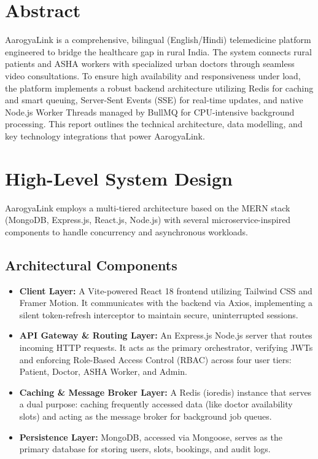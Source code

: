 \documentclass[12pt, a4paper]{article}
\begin{document}
\section{Abstract}
AarogyaLink is a comprehensive, bilingual (English/Hindi) telemedicine platform engineered to bridge the healthcare gap in rural India. The system connects rural patients and ASHA workers with specialized urban doctors through seamless video consultations. To ensure high availability and responsiveness under load, the platform implements a robust backend architecture utilizing Redis for caching and smart queuing, Server-Sent Events (SSE) for real-time updates, and native Node.js Worker Threads managed by BullMQ for CPU-intensive background processing. This report outlines the technical architecture, data modelling, and key technology integrations that power AarogyaLink.

\section{High-Level System Design}
AarogyaLink employs a multi-tiered architecture based on the MERN stack (MongoDB, Express.js, React.js, Node.js) with several microservice-inspired components to handle concurrency and asynchronous workloads.

\subsection{Architectural Components}
\begin{itemize}[label=\textbullet]
    \item \textbf{Client Layer:} A Vite-powered React 18 frontend utilizing Tailwind CSS and Framer Motion. It communicates with the backend via Axios, implementing a silent token-refresh interceptor to maintain secure, uninterrupted sessions.
    \item \textbf{API Gateway \& Routing Layer:} An Express.js Node.js server that routes incoming HTTP requests. It acts as the primary orchestrator, verifying JWTs and enforcing Role-Based Access Control (RBAC) across four user tiers: Patient, Doctor, ASHA Worker, and Admin.
    \item \textbf{Caching \& Message Broker Layer:} A Redis (ioredis) instance that serves a dual purpose: caching frequently accessed data (like doctor availability slots) and acting as the message broker for background job queues.
    \item \textbf{Persistence Layer:} MongoDB, accessed via Mongoose, serves as the primary database for storing users, slots, bookings, and audit logs.
\end{itemize}
\end{document}
